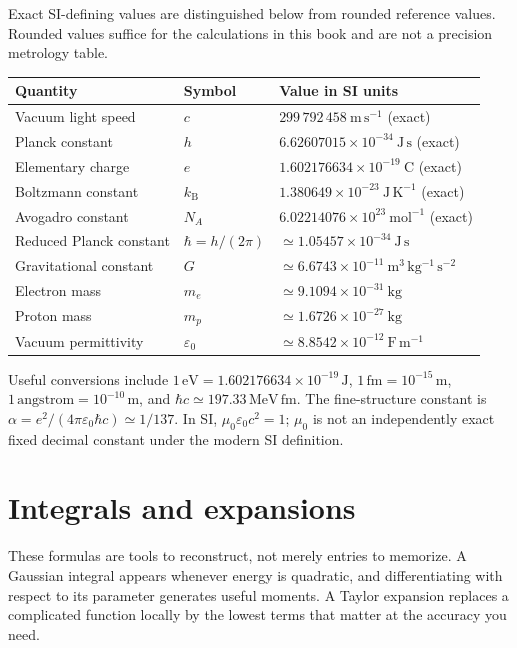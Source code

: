 \documentclass[11pt,oneside]{book}
\newcommand{\kb}{k_{\mathrm B}}
\newcommand{\eps}{\varepsilon_0}
\newcommand{\mun}{\mu_0}
\theoremstyle{reviewstyle}
\begin{document}
Exact SI-defining values are distinguished below from rounded reference values. Rounded values suffice for the calculations in this book and are not a precision metrology table.
\begin{center}
\begin{tabular}{lll}
\toprule
Quantity & Symbol & Value in SI units\\
\midrule
Vacuum light speed & $c$ & $299\,792\,458\ \mathrm{m\,s^{-1}}$ (exact)\\
Planck constant & $h$ & $6.62607015\times10^{-34}\ \mathrm{J\,s}$ (exact)\\
Elementary charge & $e$ & $1.602176634\times10^{-19}\ \mathrm C$ (exact)\\
Boltzmann constant & $\kb$ & $1.380649\times10^{-23}\ \mathrm{J\,K^{-1}}$ (exact)\\
Avogadro constant & $N_A$ & $6.02214076\times10^{23}\ \mathrm{mol^{-1}}$ (exact)\\
Reduced Planck constant & $\hbar=h/(2\pi)$ & $\simeq1.05457\times10^{-34}\ \mathrm{J\,s}$\\
Gravitational constant & $G$ & $\simeq6.6743\times10^{-11}\ \mathrm{m^3\,kg^{-1}\,s^{-2}}$\\
Electron mass & $m_e$ & $\simeq9.1094\times10^{-31}\ \mathrm{kg}$\\
Proton mass & $m_p$ & $\simeq1.6726\times10^{-27}\ \mathrm{kg}$\\
Vacuum permittivity & $\eps$ & $\simeq8.8542\times10^{-12}\ \mathrm{F\,m^{-1}}$\\
\bottomrule
\end{tabular}
\end{center}
Useful conversions include $1\,\mathrm{eV}=1.602176634\times10^{-19}\,\mathrm J$, $1\,\mathrm{fm}=10^{-15}\,\mathrm m$, $1\,\text{angstrom}=10^{-10}\,\mathrm m$, and $\hbar c\simeq197.33\,\mathrm{MeV\,fm}$. The fine-structure constant is $\alpha=e^2/(4\pi\eps\hbar c)\simeq1/137$. In SI, $\mun\eps c^2=1$; $\mun$ is not an independently exact fixed decimal constant under the modern SI definition.
\section{Integrals and expansions}
These formulas are tools to reconstruct, not merely entries to memorize. A Gaussian integral appears whenever energy is quadratic, and differentiating with respect to its parameter generates useful moments. A Taylor expansion replaces a complicated function locally by the lowest terms that matter at the accuracy you need.
\end{document}
